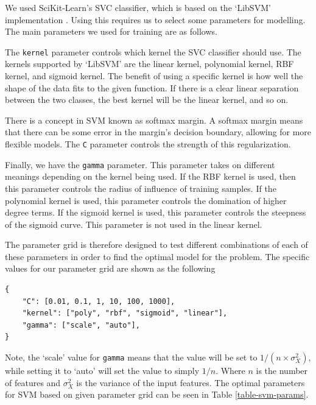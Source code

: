 \documentclass[journal]{IEEEtran}
\begin{document}


We used SciKit-Learn's SVC classifier, which is based on the `LibSVM' implementation \cite{scikit-learn,chang2011libsvm}. Using this requires us to select some parameters for modelling. The main parameters we used for training are as follows.

The \lstinline{kernel} parameter controls which kernel the SVC classifier should use. The kernels supported by `LibSVM' are the linear kernel, polynomial kernel, RBF kernel, and sigmoid kernel. The benefit of using a specific kernel is how well the shape of the data fits to the given function. If there is a clear linear separation between the two classes, the best kernel will be the linear kernel, and so on.

There is a concept in SVM known as softmax margin. A softmax margin means that there can be some error in the margin's decision boundary, allowing for more flexible models. The \lstinline{C} parameter controls the strength of this regularization.

Finally, we have the \lstinline{gamma} parameter. This parameter takes on different meanings depending on the kernel being used. If the RBF kernel is used, then this parameter controls the radius of influence of training samples. If the polynomial kernel is used, this parameter controls the domination of higher degree terms. If the sigmoid kernel is used, this parameter controls the steepness of the sigmoid curve. This parameter is not used in the linear kernel. \cite{scikit-learn}

The parameter grid is therefore designed to test different combinations of each of these parameters in order to find the optimal model for the problem. The specific values for our parameter grid are shown as the following 
\begin{lstlisting}
{
    "C": [0.01, 0.1, 1, 10, 100, 1000],
    "kernel": ["poly", "rbf", "sigmoid", "linear"],
    "gamma": ["scale", "auto"],
}
\end{lstlisting}
Note, the `scale' value for \lstinline{gamma} means that the value will be set to $1/(n \times \sigma^{2}_{X})$, while setting it to `auto' will set the value to simply $1/n$. Where $n$ is the number of features and $\sigma^{2}_{X}$ is the variance of the input features. The optimal parameters for SVM based on given parameter grid can be seen in Table \ref{table-svm-params}.


\end{document}
